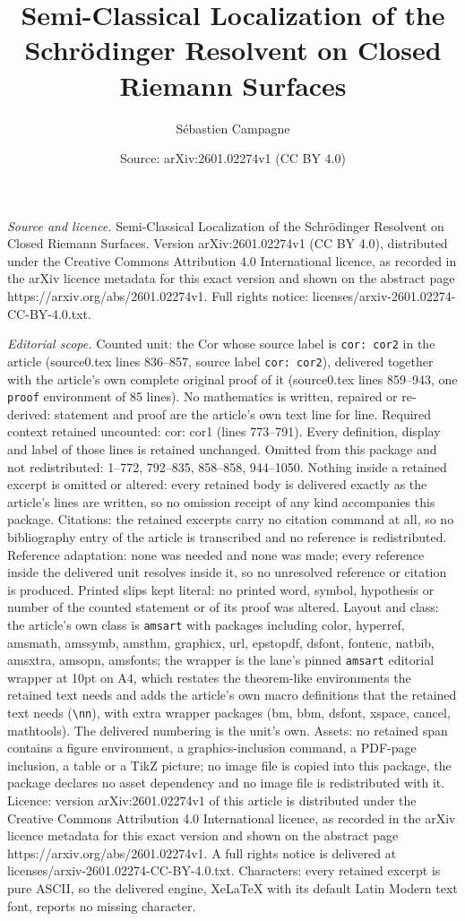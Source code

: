 \documentclass[10pt,a4paper]{amsart}
\title[Semi-Classical Localization of the Schr\"odinger Resolvent o]{Semi-Classical Localization of the Schr\"odinger Resolvent on Closed Riemann Surfaces}
\author{S\'ebastien Campagne}
\date{Source: arXiv:2601.02274v1 (CC BY 4.0)}
\begin{document}
\maketitle

\noindent\emph{Source and licence.} Semi-Classical Localization of the Schr\"odinger Resolvent on Closed Riemann Surfaces. Version arXiv:2601.02274v1 (CC BY 4.0), distributed under the Creative Commons Attribution 4.0 International licence, as recorded in the arXiv licence metadata for this exact version and shown on the abstract page https://arxiv.org/abs/2601.02274v1. Full rights notice: licenses/arxiv-2601.02274-CC-BY-4.0.txt.\par\smallskip

\noindent\textit{Editorial scope.} Counted unit: the Cor whose source label is \texttt{cor: cor2} in the article (source0.tex lines 836--857, source label \texttt{cor: cor2}), delivered together with the article's own complete original proof of it (source0.tex lines 859--943, one \texttt{proof} environment of 85 lines). No mathematics is written, repaired or re-derived: statement and proof are the article's own text line for line. Required context retained uncounted: cor: cor1 (lines 773--791). Every definition, display and label of those lines is retained unchanged. Omitted from this package and not redistributed: 1--772, 792--835, 858--858, 944--1050. Nothing inside a retained excerpt is omitted or altered: every retained body is delivered exactly as the article's lines are written, so no omission receipt of any kind accompanies this package. Citations: the retained excerpts carry no citation command at all, so no bibliography entry of the article is transcribed and no reference is redistributed. Reference adaptation: none was needed and none was made; every reference inside the delivered unit resolves inside it, so no unresolved reference or citation is produced. Printed slips kept literal: no printed word, symbol, hypothesis or number of the counted statement or of its proof was altered. Layout and class: the article's own class is \texttt{amsart} with packages including color, hyperref, amsmath, amssymb, amsthm, graphicx, url, epstopdf, dsfont, fontenc, natbib, amsxtra, amsopn, amsfonts; the wrapper is the lane's pinned \texttt{amsart} editorial wrapper at 10pt on A4, which restates the theorem-like environments the retained text needs and adds the article's own macro definitions that the retained text needs (\texttt{\textbackslash nn}), with extra wrapper packages (bm, bbm, dsfont, xspace, cancel, mathtools). The delivered numbering is the unit's own. Assets: no retained span contains a figure environment, a graphics-inclusion command, a PDF-page inclusion, a table or a TikZ picture; no image file is copied into this package, the package declares no asset dependency and no image file is redistributed with it. Licence: version arXiv:2601.02274v1 of this article is distributed under the Creative Commons Attribution 4.0 International licence, as recorded in the arXiv licence metadata for this exact version and shown on the abstract page https://arxiv.org/abs/2601.02274v1. A full rights notice is delivered at licenses/arxiv-2601.02274-CC-BY-4.0.txt. Characters: every retained excerpt is pure ASCII, so the delivered engine, XeLaTeX with its default Latin Modern text font, reports no missing character.
\end{document}
